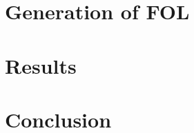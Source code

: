 \documentclass{article}
\begin{document}
\section{Generation of FOL}{}

\section{Results}{}

\section{Conclusion}{}



\citation
\end{document}
